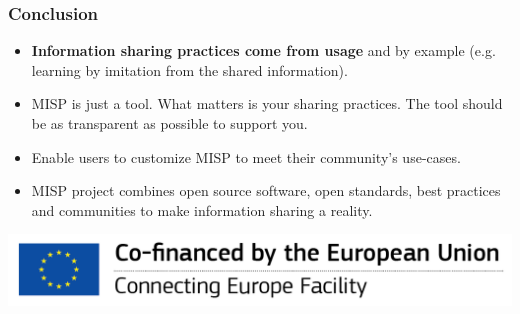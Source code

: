 \begin{frame}
        \frametitle{Conclusion}
        \begin{itemize}
                \item {\bf Information sharing practices come from usage} and by example (e.g. learning by imitation from the shared information).
                \item MISP is just a tool. What matters is your sharing practices. The tool should be as transparent as possible to support you.
                \item Enable users to customize MISP to meet their community's use-cases.
                \item MISP project combines open source software, open standards, best practices and communities to make information sharing a reality.
        \end{itemize}
        \begin{center}
        \includegraphics[scale=0.5]{en_cef.png}
        \end{center}
\end{frame}


